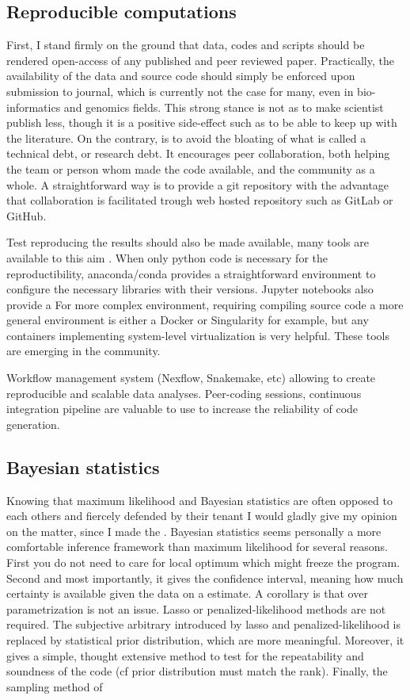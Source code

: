 \subsection{Reproducible computations}
First, I stand firmly on the ground that data, codes and scripts should be rendered open-access of any published and peer reviewed paper.
Practically, the availability of the data and source code should simply be enforced upon submission to journal, which is currently not the case for many, even in bio-informatics and genomics fields.
This strong stance is not as to make scientist publish less, though it is a positive side-effect such as to be able to keep up with the literature.
On the contrary, is to avoid the bloating of what is called a technical debt, or research debt.
It encourages peer collaboration, both helping the team or person whom made the code available, and the community as a whole.
A straightforward way is to provide a git repository with the advantage that collaboration is facilitated trough web hosted repository such as GitLab or GitHub.

Test reproducing the results should also be made available, many tools are available to this aim \citep{Wilson2014,Darriba2018}.
When only python code is necessary for the reproductibility, anaconda/conda provides a straightforward environment to configure the necessary libraries with their versions. 
Jupyter notebooks also provide a 
For more complex environment, requiring compiling source code a more general environment is either a Docker or Singularity for example, but any containers implementing system-level virtualization is very helpful.
These tools are emerging in the community.


Workflow management system (Nexflow, Snakemake, etc) allowing to create reproducible and scalable data analyses.
Peer-coding sessions, continuous integration pipeline are valuable to use to increase the reliability of code generation.
 
\subsection{Bayesian statistics}
Knowing that maximum likelihood and Bayesian statistics are often opposed to each others and fiercely defended by their tenant I would gladly give my opinion on the matter, since I made the . 
Bayesian statistics seems personally a more comfortable inference framework than maximum likelihood for several reasons. 
First you do not need to care for local optimum which might freeze the program.
Second and most importantly, it gives the confidence interval, meaning how much certainty is available given the data on a estimate.
A corollary is that over parametrization is not an issue. 
Lasso or penalized-likelihood methods are not required.
The subjective arbitrary introduced by lasso and penalized-likelihood is replaced by statistical prior distribution, which are more meaningful.
Moreover, it gives a simple, thought extensive method to test for the repeatability and soundness of the code (cf prior distribution must match the rank).
Finally, the sampling method of 

